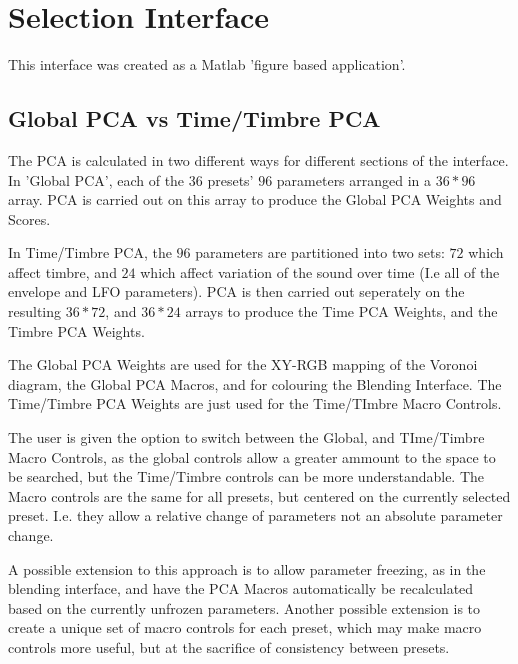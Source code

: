 \documentclass[11pt, oneside]{report}   	%
\begin{document}
\section{Selection Interface}
This interface was created as a Matlab 'figure based application'.
\subsection{Global PCA vs Time/Timbre PCA}
The PCA is calculated in two different ways for different sections of the interface. In 'Global PCA', each of the $36$ presets' $96$ parameters arranged in a $36 * 96$ array. PCA is carried out on this array to produce the Global PCA Weights and Scores. 

In Time/Timbre PCA, the $96$ parameters are partitioned into two sets: $72$ which affect timbre, and $24$ which affect variation of the sound over time (I.e all of the envelope and LFO parameters). PCA is then carried out seperately on the resulting  $36 * 72$, and $36 * 24$ arrays to produce the Time PCA Weights, and the Timbre PCA Weights. 

The Global PCA Weights are used for the XY-RGB mapping of the Voronoi diagram, the Global PCA Macros, and for colouring the Blending Interface. The Time/Timbre PCA Weights are just used for the Time/TImbre Macro Controls.

The user is given the option to switch between the Global, and TIme/Timbre Macro Controls, as the global controls allow a greater ammount to the space to be searched, but the Time/Timbre controls can be more understandable. 
The Macro controls are the same for all presets, but centered on the currently selected preset. I.e. they allow a relative change of parameters not an absolute parameter change.

A possible extension to this approach is to allow parameter freezing, as in the blending interface, and have the PCA Macros automatically be recalculated based on the currently unfrozen parameters.
Another possible extension is to create a unique set of macro controls for each preset, which may make macro controls more useful, but at the sacrifice of consistency between presets.
\end{document}
